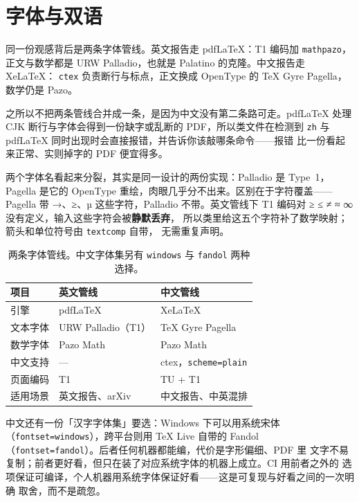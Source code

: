 \section{字体与双语}
\label{sec:type}

同一份观感背后是两条字体管线。英文报告走 pdfLaTeX：T1 编码加 \texttt{mathpazo}，
正文与数学都是 URW Palladio，也就是 Palatino 的克隆。中文报告走 XeLaTeX：
\texttt{ctex} 负责断行与标点，正文换成 OpenType 的 TeX Gyre Pagella，
数学仍是 Pazo\citep{ctex,texgyre}。

之所以不把两条管线合并成一条，是因为中文没有第二条路可走。pdfLaTeX 处理
CJK 断行与字体会得到一份缺字或乱断的 PDF，所以类文件在检测到
\texttt{zh} 与 pdfLaTeX 同时出现时会直接报错，并告诉你该敲哪条命令——报错
比一份看起来正常、实则掉字的 PDF 便宜得多。

两个字体名看起来分裂，其实是同一设计的两份实现：Palladio 是 Type~1，
Pagella 是它的 OpenType 重绘，肉眼几乎分不出来。区别在于字符覆盖——Pagella
带 →、≥、µ 这些字符，Palladio 不带。英文管线下
T1 编码对 ≥ ≤ ≠ ≈ ∞ 没有定义，输入这些字符会被\textbf{静默丢弃}，
所以类里给这五个字符补了数学映射；箭头和单位符号由 \texttt{textcomp} 自带，
无需重复声明。

\begin{table}[htbp]
  \centering
  \small
  \caption{两条字体管线。中文字体集另有 \texttt{windows} 与 \texttt{fandol} 两种选择。}
  \label{tab:pipeline}
  \begin{tabular}{@{}lll@{}}
    \toprule
    项目 & 英文管线 & 中文管线 \\
    \midrule
    引擎        & pdfLaTeX          & XeLaTeX \\
    文本字体    & URW Palladio（T1）& TeX Gyre Pagella \\
    数学字体    & Pazo Math         & Pazo Math \\
    中文支持    & ---               & ctex，\texttt{scheme=plain} \\
    页面编码    & T1                & TU + T1 \\
    适用场景    & 英文报告、arXiv   & 中文报告、中英混排 \\
    \bottomrule
  \end{tabular}
\end{table}

中文还有一份「汉字字体集」要选：Windows 下可以用系统宋体
（\texttt{fontset=windows}），跨平台则用 TeX Live 自带的 Fandol
（\texttt{fontset=fandol}）。后者任何机器都能编，代价是字形偏细、PDF 里
文字不易复制；前者更好看，但只在装了对应系统字体的机器上成立。CI 用前者之外的
选项保证可编译，个人机器用系统字体保证好看——这是可复现与好看之间的一次明确
取舍，而不是疏忽。

